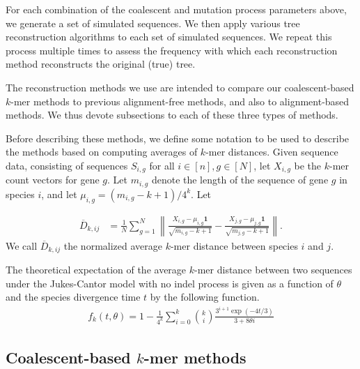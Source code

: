\documentclass[12pt]{article}
\newcommand\norm[1]{\left\lVert#1\right\rVert}
\theoremstyle{definition}
\begin{document}
For each combination of the coalescent and mutation process parameters above, we generate a set of simulated sequences. We then apply various tree reconstruction algorithms to each set of simulated sequences. We repeat this process multiple times to assess the frequency with which each reconstruction method reconstructs the original (true) tree.

The reconstruction methods we use are intended to compare our coalescent-based $k$-mer methods to previous alignment-free methods, and also to alignment-based methods. We thus devote subsections to each of these three types of methods.

Before describing these methods, we define some notation to be used to describe the methods based on computing averages of $k$-mer distances. Given sequence data, consisting of sequences $S_{i,g}$ for all $i \in [n], g \in [N]$, let $X_{i,g}$ be the $k$-mer count vectors for gene $g$. Let $m_{i,g}$ denote the length of the sequence of gene $g$ in species $i$, and let $\mu_{i,g} = (m_{i,g}-k+1)/4^k$. Let

\begin{align*}
    \overline{D}_{k,{ij}} &= \frac{1}{N}\sum_{g =1}^N \norm {\frac{X_{i,g}-\mu_{i,g}\mathbf{1}}{\sqrt{m_{i,g}-k+1}}-\frac{X_{j,g}-\mu_{j,g}\mathbf{1}}{\sqrt{m_{j,g}-k+1}}}.
\end{align*}
We call $\overline{D}_{k,{ij}}$ the normalized average $k$-mer distance between species $i$ and $j$.

The theoretical expectation of the average $k$-mer distance between two sequences under the Jukes-Cantor model with no indel process is given as a function of $\theta$ and the species divergence time $t$ by the following function.
\begin{align*}
    f_k(t,\theta) = 1-\frac{1}{4^k}\sum_{i=0}^{k} { k \choose i } \frac{3^{i+1} \exp(-4 t/3)}{3 + 8 \theta i}
\end{align*}

\subsection{Coalescent-based $k$-mer methods}
\end{document}
